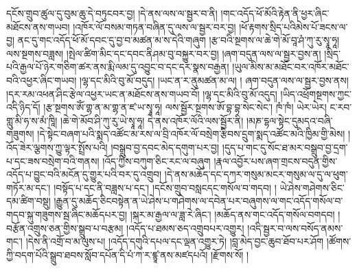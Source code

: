 དངོས་གྲུབ་ཚུལ་དུ་བུམ་ཆུ་དེ་བཏུངབར་བྱ། །དེ་ནས་ལས་ལ་སྦྱར་བ་ནི། །གང་འདོད་ཕོ་མོའི་རྟེན་ནི་ཕྱར་ཞིང་མཐོངས་ནས་གཡབ། །འཁོར་ལོ་བསམ་གཏན་བཞིན་དུ་ལས་ལ་སྦྱར་བར་བྱ། །ཕོ་རྟགས་སྲིད་པའིམེས་པོ་ཟངས་ལ་བྱ། ནང་དུ་གང་འདོད་ཕོ་མོ་དབང་དུ་བྱ་བ་མཚན་མ་ས་དེའི་གཞུག །རྩ་བའི་སྔགས་ལ་ཆེ་གེ་མོ་བཱ་ཤཾ་ཀུ་རུ་སྭཱ་ཧཱ། ལས་སྔགས་བཟླས། །སྤེལ་ཚིག་མིང་དང་དབང་ནིཤམ་བུ་བསྐྱུར་བར་བྱ། །ཞག་བདུན་ལས་ལ་སྦྱར་བྱས་ན། །སྲིད་པའི་རྒྱལ་པོ་ཉེར་གཅིག་ཚར་ནས་རྨི་ལམ་དུ་འབྱུང་བ་དང་དར་སྣས་བརྒྱན། །ཡུལ་མིས་མ་མཐོང་བར་འཁོར་མཐོང་བའི་འཕྱར་ཞིང་གཡབ། །ལྷ་དང་མིའི་བུ་མོ་བདུད། །ཡང་ན་ར་ནུམཚན་མ་ལ། ། ཞག་བདུན་ལས་ལ་སྦྱར་བྱས་ནས། །དར་རམ་འཕན་ཤིང་རྩེལ་འཕྱར་ཡང་ན་མཐོངས་ནས་གཡབ་བོ། །ལྷ་དང་མིའི་བུ་མོ་འདུད། །ཡིད་འཕྲོགསྔགས་ཀྱང་འདི་ཉིད་དོ། །རྩ་སྔགས་ཨོཾ་གྷ་ན་མ་གྷ་ན་ཛ་ཡ་སྭཱ་ཧཱ། ལས་སྦྱོར་སྔགས་ཨོ་བྷ་བྷ་སེང་སེང་། ཁཾ་ཁཾ། ཡེར་ཡེར། ང་རབ་གླུ་མི་ཧ་ས་མཾ་ཁཱི། །ཆེ་གེ་མོབ་ཤི་ཀུ་རུ་ཡེ་སྭཱ་ཧཱ། དེ་ནས་འཁོར་ལོའི་ལས་སྦྱོར་ནི། །མཎ་དྷལ་སྟེང་དུམདའ་བཞི་གཟུགས། །དེ་སྟེང་བཞག་པའི་སྨད་འཚོང་མ་རས་ལ་བྲི་འཁོར་ལོ་བསྲེག་རྩིབས་དྲུག་སྨད་འཚོང་མའི་ཁྱིམ་གྱི་མེས། །འོད་ཟེར་ལྕགས་ཀྱུ་ལྟར་སྤྲོས་པའི། །བསྒྲུབ་བྱ་དབང་མེད་དགུག་པར་བྱ། །དུད་པ་གང་དུ་སོང་ཐ་མར་བསྒྲུབ་བྱ་དྲག་པ་དང་ཟས་བསྲེག་བའི་གནས། །འོད་ཀྱིས་བཀུག་ཅིང་རང་ལ་བཞུག །རྣལ་འབྱོར་པས་ཞག་གྲངས་བདུན་གྱིས་འདོད་པ་བྱུང་བའི་མངོན་དུ་གྱུར་པའི་བར་དུ་འགྲུབ། །དེ་ནས་མཆོད་དང་དཀར་གསུམ་མངར་གསུམ་ལ་དུ་ལ་ཕུག་གཏོར་མ་དང་། །བསྟོད་པ་དང་ནི་བཟླས་པ་དང་། །དངོས་གྲུབ་བསླངདང་གསོལ་བ་གདབ། ། ཡེ་ཤེས་གཤེགས་ཅིང་དམ་ཚིག་བསྡུ། །རྒྱུན་དུ་མཆོད་ཅིངབསྟེན་ན་ཡེ་ཤེས་པ་གཤེགས་ལ་དབེན་པར་བཞུགས་ལ་གང་འདོད་གསོལ་བ་གདབ་སྐུ་གཟུགས་སྦ་ཞིང་མཆོདཔར་བྱ། །སྐར་མ་རྒྱལ་ལ་ཟླ་རེ་ཞིང་། །མཆོད་ནས་གང་འདོད་གསོལ་བགདབ། །བརྩོན་འགྲུས་ཅན་གྱིས་སྒྲུབ་པ་བརྩམ། །འདོད་པ་ཐམས་ཅད་འགྲུབཔར་འགྱུར། །འདི་སྦྱར་བ་ལས་བསོད་ནམས་གང་། །དེས་ནི་འགྲོ་བ་མ་ལུས་པ། །འདོད་དགུའི་དཔལ་དང་ལྡན་འགྱུར་ཏེ། །བླ་མེད་བྱང་ཆུབ་ཐོབ་པར་ཤོག །ཚོགས་ཀྱི་བདག་པོའི་སྒྲུབ་ཐབས་སློབ་དཔོན་དི་པཾ་ཀ་ར་ཛྙཱ་ནས་མཛདཔའོ། །རྫོགས་སོ། །